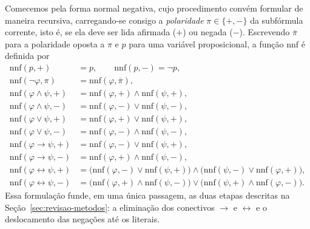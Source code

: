 \documentclass[12pt,a4paper,oneside]{report}
\theoremstyle{tituloplain}
\theoremstyle{titulodef}
\begin{document}
Comecemos pela forma normal negativa, cujo procedimento convém formular de maneira recursiva, carregando-se consigo a \textit{polaridade} $\pi \in \{+,-\}$ da subfórmula corrente, isto é, se ela deve ser lida afirmada ($+$) ou negada ($-$). Escrevendo $\overline{\pi}$ para a polaridade oposta a $\pi$ e $p$ para uma variável proposicional, a função $\mathrm{nnf}$ é definida por
\begin{align*}
\mathrm{nnf}(p,+) &= p, \qquad \mathrm{nnf}(p,-) = \neg p,\\
\mathrm{nnf}(\neg\varphi,\pi) &= \mathrm{nnf}(\varphi,\overline{\pi}),\\
\mathrm{nnf}(\varphi\wedge\psi,+) &= \mathrm{nnf}(\varphi,+)\wedge\mathrm{nnf}(\psi,+),\\
\mathrm{nnf}(\varphi\wedge\psi,-) &= \mathrm{nnf}(\varphi,-)\vee\mathrm{nnf}(\psi,-),\\
\mathrm{nnf}(\varphi\vee\psi,+) &= \mathrm{nnf}(\varphi,+)\vee\mathrm{nnf}(\psi,+),\\
\mathrm{nnf}(\varphi\vee\psi,-) &= \mathrm{nnf}(\varphi,-)\wedge\mathrm{nnf}(\psi,-),\\
\mathrm{nnf}(\varphi\rightarrow\psi,+) &= \mathrm{nnf}(\varphi,-)\vee\mathrm{nnf}(\psi,+),\\
\mathrm{nnf}(\varphi\rightarrow\psi,-) &= \mathrm{nnf}(\varphi,+)\wedge\mathrm{nnf}(\psi,-),\\
\mathrm{nnf}(\varphi\leftrightarrow\psi,+) &= \bigl(\mathrm{nnf}(\varphi,-)\vee\mathrm{nnf}(\psi,+)\bigr)\wedge\bigl(\mathrm{nnf}(\psi,-)\vee\mathrm{nnf}(\varphi,+)\bigr),\\
\mathrm{nnf}(\varphi\leftrightarrow\psi,-) &= \bigl(\mathrm{nnf}(\varphi,+)\wedge\mathrm{nnf}(\psi,-)\bigr)\vee\bigl(\mathrm{nnf}(\psi,+)\wedge\mathrm{nnf}(\varphi,-)\bigr).
\end{align*}
Essa formulação funde, em uma única passagem, as duas etapas descritas na Seção~\ref{sec:revisao-metodos}: a eliminação dos conectivos $\rightarrow$ e $\leftrightarrow$ e o deslocamento das negações até os literais.
 
\end{document}
